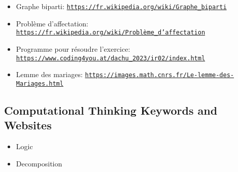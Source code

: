 \documentclass[a4paper,11pt]{report}
\newcommand{\BrochureUrlText}[1]{\texttt{#1}}
\begin{document}
\begin{itemize}
  \item Graphe biparti: \href{https://fr.wikipedia.org/wiki/Graphe_biparti}{\BrochureUrlText{https://fr.wikipedia.org/wiki/Graphe\_biparti}}
  \item Problème d’affectation: \href{https://fr.wikipedia.org/wiki/Probl\%C3\%A8me_d\%27affectation}{\BrochureUrlText{https://fr.wikipedia.org/wiki/Problème\_d’affectation}}
  \item Programme pour résoudre l’exercice: \href{https://www.coding4you.at/dachu_2023/ir02/index.html}{\BrochureUrlText{https://www.coding4you.at/dachu\_2023/ir02/index.html}}
  \item Lemme des mariages: \href{https://images.math.cnrs.fr/Le-lemme-des-Mariages.html}{\BrochureUrlText{https://images.math.cnrs.fr/Le-lemme-des-Mariages.html}}
\end{itemize}


\subsection*{Computational Thinking Keywords and Websites}

\begin{itemize}
  \item Logic
  \item Decomposition
\end{itemize}
\end{document}
